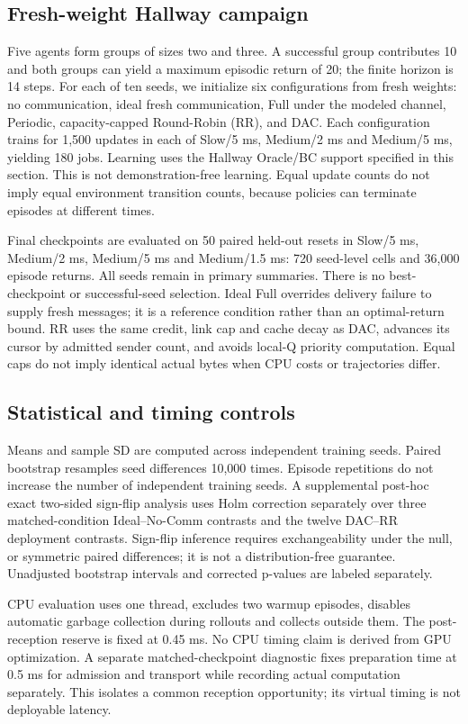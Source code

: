 \documentclass[11pt,a4paper]{article}
\begin{document}
\subsection{Fresh-weight Hallway campaign}
Five agents form groups of sizes two and three. A successful group contributes 10 and both groups can yield a maximum episodic return of 20; the finite horizon is 14 steps. For each of ten seeds, we initialize six configurations from fresh weights: no communication, ideal fresh communication, Full under the modeled channel, Periodic, capacity-capped Round-Robin (RR), and DAC. Each configuration trains for 1,500 updates in each of Slow/5 ms, Medium/2 ms and Medium/5 ms, yielding 180 jobs. Learning uses the Hallway Oracle/BC support specified in this section. This is not demonstration-free learning. Equal update counts do not imply equal environment transition counts, because policies can terminate episodes at different times.

Final checkpoints are evaluated on 50 paired held-out resets in Slow/5 ms, Medium/2 ms, Medium/5 ms and Medium/1.5 ms: 720 seed-level cells and 36,000 episode returns. All seeds remain in primary summaries. There is no best-checkpoint or successful-seed selection. Ideal Full overrides delivery failure to supply fresh messages; it is a reference condition rather than an optimal-return bound. RR uses the same credit, link cap and cache decay as DAC, advances its cursor by admitted sender count, and avoids local-Q priority computation. Equal caps do not imply identical actual bytes when CPU costs or trajectories differ.

\subsection{Statistical and timing controls}
Means and sample SD are computed across independent training seeds. Paired bootstrap resamples seed differences 10,000 times. Episode repetitions do not increase the number of independent training seeds. A supplemental post-hoc exact two-sided sign-flip analysis uses Holm correction separately over three matched-condition Ideal--No-Comm contrasts and the twelve DAC--RR deployment contrasts. Sign-flip inference requires exchangeability under the null, or symmetric paired differences; it is not a distribution-free guarantee. Unadjusted bootstrap intervals and corrected p-values are labeled separately.

CPU evaluation uses one thread, excludes two warmup episodes, disables automatic garbage collection during rollouts and collects outside them. The post-reception reserve is fixed at 0.45 ms. No CPU timing claim is derived from GPU optimization. A separate matched-checkpoint diagnostic fixes preparation time at 0.5 ms for admission and transport while recording actual computation separately. This isolates a common reception opportunity; its virtual timing is not deployable latency.
\end{document}
